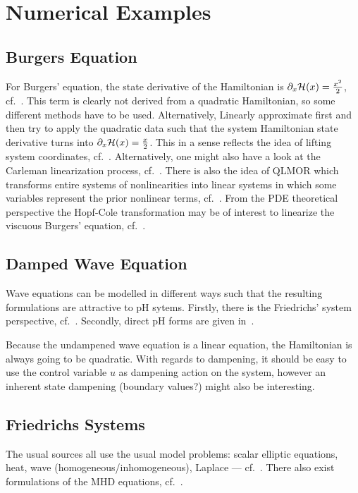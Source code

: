 \section{Numerical Examples}

\subsection{Burgers Equation}

For Burgers' equation, the state derivative of the Hamiltonian is $\partial_{x} \mathcal{H}(x) = \frac{x^2}{2}$, cf.~\cite{Maschke2005}.
This term is clearly not derived from a quadratic Hamiltonian, so some different methods have to be used.
Alternatively, Linearly approximate first and then try to apply the quadratic data such that the system Hamiltonian state derivative turns into $\partial_{x} \mathcal{H}(x) = \frac{x}{2}$.
This in a sense reflects the idea of lifting system coordinates, cf.~\cite{Qian2020, Kramer2019}.
Alternatively, one might also have a look at the Carleman linearization process, cf.~\cite{Goyal2015, Rugh1981}.
There is also the idea of QLMOR which transforms entire systems of nonlinearities into linear systems in which some variables represent the prior nonlinear terms, cf.~\cite{Gu2011}.
From the PDE theoretical perspective the Hopf-Cole transformation may be of interest to linearize the viscuous Burgers' equation, cf.~\cite{Hopf1950, Cole1951, Kannan2012, Chen2016}.

\subsection{Damped Wave Equation}

Wave equations can be modelled in different ways such that the resulting formulations are attractive to pH sytems.
Firstly, there is the Friedrichs' system perspective, cf.~\cite{Friedrichs1958, Antonic2014, Mifsud2016}.
Secondly, direct pH forms are given in~\cite{Cardoso2018, Serhani2019}.

Because the undampened wave equation is a linear equation, the Hamiltonian is always going to be quadratic.
With regards to dampening, it should be easy to use the control variable $u$ as dampening action on the system, however an inherent state dampening (boundary values?) might also be interesting.

\subsection{Friedrichs Systems}

The usual sources all use the usual model problems: scalar elliptic equations, heat, wave (homogeneous/inhomogeneous), Laplace --- cf.~\cite{Friedrichs1958, Burman2010, Antonic2013, Antonic2014, Mifsud2016, Erceg2022}.
There also exist formulations of the MHD equations, cf.~\cite{Ern2006}.

